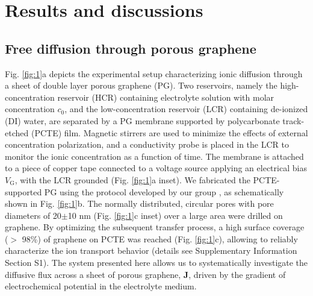 \documentclass[journal=langd5,email=true, hyperref=true, keywords=false]{achemso}
\newcommand{\Fig}{Fig.}
\begin{document}
\section{Results and discussions}
\label{sec:res}

\subsection{Free diffusion through porous graphene}
\label{sec:res-1}

\Fig{} \ref{fig:1}a depicts the experimental setup characterizing
ionic diffusion through a sheet of double layer porous graphene
(PG). Two reservoirs, namely the high-concentration reservoir (HCR)
containing electrolyte solution with molar concentration $c_0$, and
the low-concentration reservoir (LCR) containing de-ionized (DI)
water, are separated by a PG membrane supported by polycarbonate
track-etched (PCTE) film. Magnetic stirrers are used to minimize the
effects of external concentration polarization, and a conductivity
probe is placed in the LCR to monitor the ionic concentration as a
function of time. The membrane is attached to a piece of copper tape
connected to a voltage source applying an electrical bias
$V_{\mathrm{G}}$, with the LCR grounded (\Fig{} \ref{fig:1}a
inset). We fabricated the PCTE-supported PG using the protocol
developed by our group \cite{Choi_2018}, as schematically shown in
\Fig{} \ref{fig:1}b. The normally distributed, circular pores with
pore diameters of 20$\pm$10 nm (\Fig{} \ref{fig:1}c inset) over a
large area were drilled on graphene.  By optimizing the subsequent
transfer process, a high surface coverage ($>$ 98\%) of graphene on
PCTE was reached (\Fig{} \ref{fig:1}c), allowing to reliably
characterize the ion transport behavior (details see Supplementary
Information Section S1).  The system presented here allows us to
systematically investigate the diffusive flux across a sheet of porous
graphene, $\boldsymbol{J}$, driven by the gradient of electrochemical
potential in the electrolyte medium.
\end{document}
